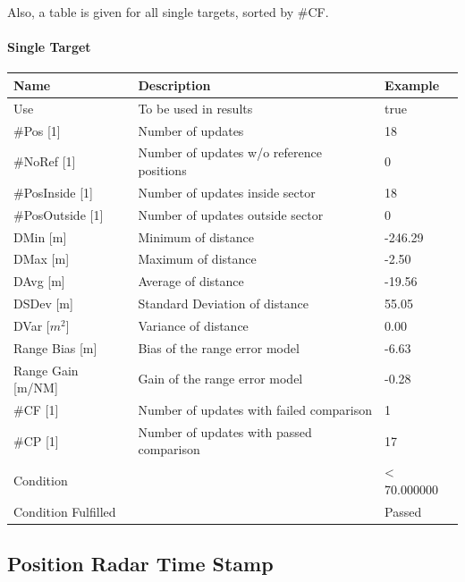 Also, a table is given for all single targets, sorted by \#CF.

\paragraph{Single Target}

\begin{center}
 \begin{table}[H]
  \begin{tabularx}{\textwidth}{ | l | X |  l | }
    \hline
    \textbf{Name} & \textbf{Description} & \textbf{Example} \\ \hline
    Use & To be used in results & true \\ \hline
    \#Pos [1] & Number of updates & 18 \\ \hline
    \#NoRef [1] & Number of updates w/o reference positions & 0 \\ \hline
    \#PosInside [1] & Number of updates inside sector & 18 \\ \hline
    \#PosOutside [1] & Number of updates outside sector & 0 \\ \hline
    DMin [m] & Minimum of distance & -246.29 \\ \hline
    DMax [m] & Maximum of distance & -2.50 \\ \hline
    DAvg [m] & Average of distance & -19.56 \\ \hline
    DSDev [m] & Standard Deviation of distance & 55.05 \\ \hline
    DVar [$m^2$] & Variance of distance & 0.00 \\ \hline
    Range Bias [m] & Bias of the range error model & -6.63 \\ \hline
    Range Gain [m/NM] & Gain of the range error model & -0.28 \\ \hline
    \#CF [1] & Number of updates with failed comparison & 1 \\ \hline
    \#CP [1] & Number of updates with passed comparison & 17 \\ \hline
    Condition &  & < 70.000000 \\ \hline
    Condition Fulfilled &  & Passed \\ \hline
\end{tabularx}
\end{table}
\end{center}

\subsection{Position Radar Time Stamp}
\label{sec:eval_req_pos_radar_tse}

